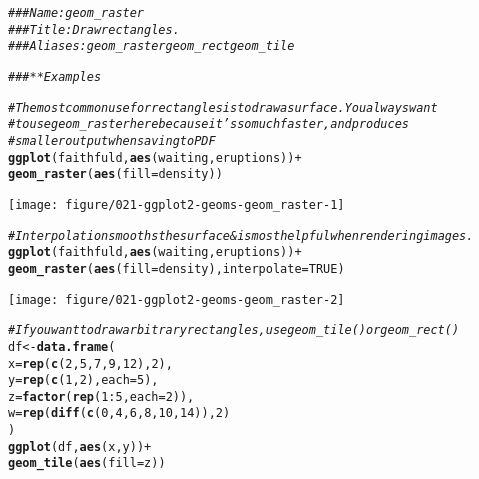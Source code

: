 \documentclass[a4paper,titlepage]{tufte-handout}\usepackage[]{graphicx}\usepackage[]{color}
\makeatletter
\def\maxwidth{ %
  \ifdim\Gin@nat@width>\linewidth
    \linewidth
  \else
    \Gin@nat@width
  \fi
}
\newcommand{\hlnum}[1]{\textcolor[rgb]{0.686,0.059,0.569}{#1}}%
\newcommand{\hlcom}[1]{\textcolor[rgb]{0.678,0.584,0.686}{\textit{#1}}}%
\newcommand{\hlopt}[1]{\textcolor[rgb]{0,0,0}{#1}}%
\newcommand{\hlstd}[1]{\textcolor[rgb]{0.345,0.345,0.345}{#1}}%
\newcommand{\hlkwb}[1]{\textcolor[rgb]{0.69,0.353,0.396}{#1}}%
\newcommand{\hlkwc}[1]{\textcolor[rgb]{0.333,0.667,0.333}{#1}}%
\newcommand{\hlkwd}[1]{\textcolor[rgb]{0.737,0.353,0.396}{\textbf{#1}}}%
\newenvironment{kframe}{%
 \def\at@end@of@kframe{}%
 \ifinner\ifhmode%
  \def\at@end@of@kframe{\end{minipage}}%
  \begin{minipage}{\columnwidth}%
 \fi\fi%
 \def\FrameCommand##1{\hskip\@totalleftmargin \hskip-\fboxsep
 \colorbox{shadecolor}{##1}\hskip-\fboxsep
     \hskip-\linewidth \hskip-\@totalleftmargin \hskip\columnwidth}%
 \MakeFramed {\advance\hsize-\width
   \@totalleftmargin\z@ \linewidth\hsize
   \@setminipage}}%
 {\par\unskip\endMakeFramed%
 \at@end@of@kframe}
\newenvironment{knitrout}{}{} %
\makeatother
\begin{document}
\begin{knitrout}
\color{fgcolor}\begin{kframe}
\begin{alltt}
\hlcom{### Name: geom_raster}
\hlcom{### Title: Draw rectangles.}
\hlcom{### Aliases: geom_raster geom_rect geom_tile}

\hlcom{### ** Examples}

\hlcom{# The most common use for rectangles is to draw a surface. You always want}
\hlcom{# to use geom_raster here because it's so much faster, and produces}
\hlcom{# smaller output when saving to PDF}
\hlkwd{ggplot}\hlstd{(faithfuld,} \hlkwd{aes}\hlstd{(waiting, eruptions))} \hlopt{+}
 \hlkwd{geom_raster}\hlstd{(}\hlkwd{aes}\hlstd{(}\hlkwc{fill} \hlstd{= density))}
\end{alltt}
\end{kframe}
\texttt{[image: figure/021-ggplot2-geoms-geom\_raster-1]} 
\begin{kframe}\begin{alltt}
\hlcom{# Interpolation smooths the surface & is most helpful when rendering images.}
\hlkwd{ggplot}\hlstd{(faithfuld,} \hlkwd{aes}\hlstd{(waiting, eruptions))} \hlopt{+}
 \hlkwd{geom_raster}\hlstd{(}\hlkwd{aes}\hlstd{(}\hlkwc{fill} \hlstd{= density),} \hlkwc{interpolate} \hlstd{=} \hlnum{TRUE}\hlstd{)}
\end{alltt}
\end{kframe}
\texttt{[image: figure/021-ggplot2-geoms-geom\_raster-2]} 
\begin{kframe}\begin{alltt}
\hlcom{# If you want to draw arbitrary rectangles, use geom_tile() or geom_rect()}
\hlstd{df} \hlkwb{<-} \hlkwd{data.frame}\hlstd{(}
  \hlkwc{x} \hlstd{=} \hlkwd{rep}\hlstd{(}\hlkwd{c}\hlstd{(}\hlnum{2}\hlstd{,} \hlnum{5}\hlstd{,} \hlnum{7}\hlstd{,} \hlnum{9}\hlstd{,} \hlnum{12}\hlstd{),} \hlnum{2}\hlstd{),}
  \hlkwc{y} \hlstd{=} \hlkwd{rep}\hlstd{(}\hlkwd{c}\hlstd{(}\hlnum{1}\hlstd{,} \hlnum{2}\hlstd{),} \hlkwc{each} \hlstd{=} \hlnum{5}\hlstd{),}
  \hlkwc{z} \hlstd{=} \hlkwd{factor}\hlstd{(}\hlkwd{rep}\hlstd{(}\hlnum{1}\hlopt{:}\hlnum{5}\hlstd{,} \hlkwc{each} \hlstd{=} \hlnum{2}\hlstd{)),}
  \hlkwc{w} \hlstd{=} \hlkwd{rep}\hlstd{(}\hlkwd{diff}\hlstd{(}\hlkwd{c}\hlstd{(}\hlnum{0}\hlstd{,} \hlnum{4}\hlstd{,} \hlnum{6}\hlstd{,} \hlnum{8}\hlstd{,} \hlnum{10}\hlstd{,} \hlnum{14}\hlstd{)),} \hlnum{2}\hlstd{)}
\hlstd{)}
\hlkwd{ggplot}\hlstd{(df,} \hlkwd{aes}\hlstd{(x, y))} \hlopt{+}
  \hlkwd{geom_tile}\hlstd{(}\hlkwd{aes}\hlstd{(}\hlkwc{fill} \hlstd{= z))}

\end{alltt}
\end{kframe}
\end{knitrout}
\end{document}
